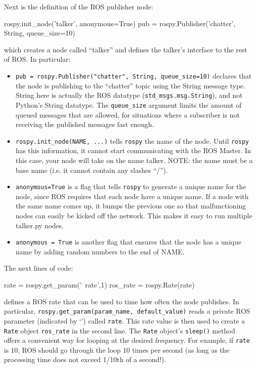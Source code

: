 \vspace{\baselineskip}
\noindent
Next is the definition of the ROS publisher node:
\begin{pythonnoborder}
rospy.init_node('talker', anonymous=True)
pub = rospy.Publisher('chatter', String, queue_size=10)
\end{pythonnoborder}
which creates a node called ``talker'' and defines the talker's interface to the rest of ROS. In particular:
\begin{itemize}
    \item \texttt{pub = rospy.Publisher("chatter", String, queue\_size=10)}  declares that the node is publishing to the ``chatter'' topic using the String message type. String here is actually the ROS datatype (\texttt{std\_msgs.msg.String}), and not Python's String datatype. The \texttt{queue\_size} argument limits the amount of queued messages that are allowed, for situations where a subscriber is not receiving the published messages fast enough.
    \item \texttt{rospy.init\_node(NAME, ...)} tells \texttt{rospy} the name of the node. Until \texttt{rospy} has this information, it cannot start communicating with the ROS Master. In this case, your node will take on the name talker. NOTE: the name must be a base name (i.e. it cannot contain any slashes ``/'').
    \item \texttt{anonymous=True} is a flag that tells \texttt{rospy} to generate a unique name for the node, since ROS requires that each node have a unique name. If a node with the same name comes up, it bumps the previous one so that malfunctioning nodes can easily be kicked off the network. This makes it easy to run multiple talker.py nodes.

    \item \texttt{anonymous = True} is another flag that ensures that the node has a unique name by adding random numbers to the end of NAME. 
\end{itemize} 
\noindent
The next lines of code:
\begin{pythonnoborder}
rate = rospy.get_param('~rate',1)
ros_rate = rospy.Rate(rate)
\end{pythonnoborder}
defines a ROS rate that can be used to time how often the node publishes. In particular, \texttt{rospy.get\_param(param\_name, default\_value)} reads a private ROS parameter (indicated by `\texttt{\mytilde}') called \texttt{rate}. This rate value is then used to create a \texttt{Rate} object \texttt{ros\_rate} in the second line.
The \texttt{Rate} object's \texttt{sleep()} method offers a convenient way for looping at the desired frequency. For example, if \texttt{rate} is 10, ROS should go through the loop 10 times per second (as long as the processing time does not exceed 1/10th of a second!).

